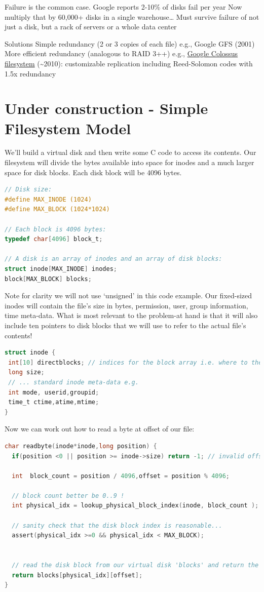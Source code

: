 Failure is the common case. Google reports 2-10\% of disks fail per year Now multiply that by 60,000+ disks in a single warehouse\ldots{} Must survive failure of not just a disk, but a rack of servers or a whole data center

Solutions Simple redundancy (2 or 3 copies of each file) e.g., Google GFS (2001) More efficient redundancy (analogous to RAID 3++) e.g., \href{http://goo.gl/LwFIy}{Google Colossus filesystem} (\textasciitilde{}2010): customizable replication including Reed-Solomon codes with 1.5x redundancy

\section{Under construction - Simple Filesystem Model}

We'll build a virtual disk and then write some C code to access its contents. Our filesystem will divide the bytes available into space for inodes and a much larger space for disk blocks. Each disk block will be 4096 bytes.

\begin{lstlisting}[language=C]
// Disk size:
#define MAX_INODE (1024)
#define MAX_BLOCK (1024*1024)

// Each block is 4096 bytes:
typedef char[4096] block_t;

// A disk is an array of inodes and an array of disk blocks:
struct inode[MAX_INODE] inodes;
block[MAX_BLOCK] blocks;
\end{lstlisting}

Note for clarity we will not use `unsigned' in this code example. Our fixed-sized inodes will contain the file's size in bytes, permission, user, group information, time meta-data. What is most relevant to the problem-at hand is that it will also include ten pointers to disk blocks that we will use to refer to the actual file's contents!

\begin{lstlisting}[language=C]
struct inode {
 int[10] directblocks; // indices for the block array i.e. where to the find the file's content
 long size;
 // ... standard inode meta-data e.g.
 int mode, userid,groupid;
 time_t ctime,atime,mtime;
}
\end{lstlisting}

Now we can work out how to read a byte at offset  of our file:

\begin{lstlisting}[language=C]
char readbyte(inode*inode,long position) {
  if(position <0 || position >= inode->size) return -1; // invalid offset

  int  block_count = position / 4096,offset = position % 4096;

  // block count better be 0..9 !
  int physical_idx = lookup_physical_block_index(inode, block_count );

  // sanity check that the disk block index is reasonable...
  assert(physical_idx >=0 && physical_idx < MAX_BLOCK);


  // read the disk block from our virtual disk 'blocks' and return the specific byte
  return blocks[physical_idx][offset];
}
\end{lstlisting}

